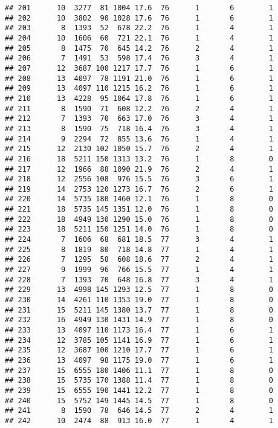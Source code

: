 \documentclass{article}\usepackage[]{graphicx}\usepackage[]{color}
\makeatletter
\newenvironment{kframe}{%
 \def\at@end@of@kframe{}%
 \ifinner\ifhmode%
  \def\at@end@of@kframe{\end{minipage}}%
  \begin{minipage}{\columnwidth}%
 \fi\fi%
 \def\FrameCommand##1{\hskip\@totalleftmargin \hskip-\fboxsep
 \colorbox{shadecolor}{##1}\hskip-\fboxsep
     \hskip-\linewidth \hskip-\@totalleftmargin \hskip\columnwidth}%
 \MakeFramed {\advance\hsize-\width
   \@totalleftmargin\z@ \linewidth\hsize
   \@setminipage}}%
 {\par\unskip\endMakeFramed%
 \at@end@of@kframe}
\newenvironment{knitrout}{}{} %
\makeatother
\begin{document}
\begin{knitrout}
\begin{kframe}
\begin{verbatim}
## 201      10  3277  81 1004 17.6  76      1       6        1
## 202      10  3802  90 1028 17.6  76      1       6        1
## 203       8  1393  52  678 22.2  76      1       4        1
## 204      10  1606  60  721 22.1  76      1       4        1
## 205       8  1475  70  645 14.2  76      2       4        1
## 206       7  1491  53  598 17.4  76      3       4        1
## 207      12  3687 100 1217 17.7  76      1       6        1
## 208      13  4097  78 1191 21.0  76      1       6        1
## 209      13  4097 110 1215 16.2  76      1       6        1
## 210      13  4228  95 1064 17.8  76      1       6        1
## 211       8  1590  71  608 12.2  76      2       4        1
## 212       7  1393  70  663 17.0  76      3       4        1
## 213       8  1590  75  718 16.4  76      3       4        1
## 214       9  2294  72  855 13.6  76      1       4        1
## 215      12  2130 102 1050 15.7  76      2       4        1
## 216      18  5211 150 1313 13.2  76      1       8        0
## 217      12  1966  88 1090 21.9  76      2       4        1
## 218      12  2556 108  976 15.5  76      3       6        1
## 219      14  2753 120 1273 16.7  76      2       6        1
## 220      14  5735 180 1460 12.1  76      1       8        0
## 221      18  5735 145 1351 12.0  76      1       8        0
## 222      18  4949 130 1290 15.0  76      1       8        0
## 223      18  5211 150 1251 14.0  76      1       8        0
## 224       7  1606  68  681 18.5  77      3       4        1
## 225       8  1819  80  718 14.8  77      1       4        1
## 226       7  1295  58  608 18.6  77      2       4        1
## 227       9  1999  96  766 15.5  77      1       4        1
## 228       7  1393  70  648 16.8  77      3       4        1
## 229      13  4998 145 1293 12.5  77      1       8        0
## 230      14  4261 110 1353 19.0  77      1       8        0
## 231      15  5211 145 1380 13.7  77      1       8        0
## 232      16  4949 130 1431 14.9  77      1       8        0
## 233      13  4097 110 1173 16.4  77      1       6        1
## 234      12  3785 105 1141 16.9  77      1       6        1
## 235      12  3687 100 1210 17.7  77      1       6        1
## 236      13  4097  98 1175 19.0  77      1       6        1
## 237      15  6555 180 1406 11.1  77      1       8        0
## 238      15  5735 170 1388 11.4  77      1       8        0
## 239      15  6555 190 1441 12.2  77      1       8        0
## 240      15  5752 149 1445 14.5  77      1       8        0
## 241       8  1590  78  646 14.5  77      2       4        1
## 242      10  2474  88  913 16.0  77      1       4        1

\end{verbatim}
\end{kframe}
\end{knitrout}
\end{document}
